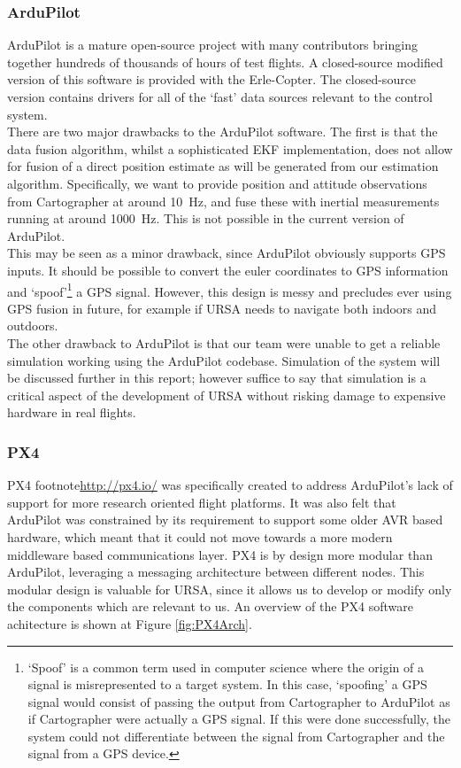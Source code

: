 \documentclass[capstone_report.tex]{subfiles}
\begin{document}
\subsubsection{ArduPilot}
ArduPilot \cite{arduhistory} is a mature open-source project with many contributors bringing together hundreds of thousands of hours of test flights. A closed-source modified version of this software is provided with the Erle-Copter. The closed-source version contains drivers for all of the `fast' data sources relevant to the control system. \\

There are two major drawbacks to the ArduPilot software. The first is that the data fusion algorithm, whilst a sophisticated EKF implementation, does not allow for fusion of a direct position estimate as will be generated from our estimation algorithm. Specifically, we want to provide position and attitude observations from Cartographer at around \SI{10}{\hertz}, and fuse these with inertial measurements running at around \SI{1000}{\hertz}. This is not possible in the current version of ArduPilot.\\

This may be seen as a minor drawback, since ArduPilot obviously supports GPS inputs. It should be possible to convert the euler coordinates to GPS information and `spoof'\footnote{`Spoof' is a common term used in computer science where the origin of a signal is misrepresented to a target system. In this case, `spoofing' a GPS signal would consist of passing the output from Cartographer to ArduPilot as if Cartographer were actually a GPS signal. If this were done successfully, the system could not differentiate between the signal from Cartographer and the signal from a GPS device.} a GPS signal. However, this design is messy and precludes ever using GPS fusion in future, for example if URSA needs to navigate both indoors and outdoors. \\

The other drawback to ArduPilot is that our team were unable to get a reliable simulation working using the ArduPilot codebase. Simulation of the system will be discussed further in this report; however suffice to say that simulation is a critical aspect of the development of URSA without risking damage to expensive hardware in real flights.

\subsubsection{PX4}
PX4 footnote{\url{http://px4.io/}} was specifically created to address ArduPilot's lack of support for more research oriented flight platforms. It was also felt that ArduPilot was constrained by its requirement to support some older AVR based hardware, which meant that it could not move towards a more modern middleware based communications layer. PX4 is by design more modular than ArduPilot, leveraging a messaging architecture between different nodes. This modular design is valuable for URSA, since it allows us to develop or modify only the components which are relevant to us. An overview of the PX4 software achitecture is shown at Figure \ref{fig:PX4Arch}.\\
\end{document}
